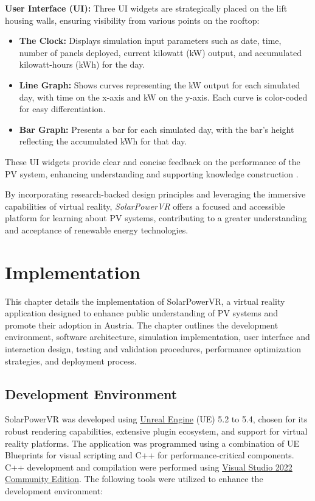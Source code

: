 \documentclass[draft, final]{vutinfth} %
\begin{document}
\textbf{User Interface (UI):} Three UI widgets are strategically placed on the lift housing walls, ensuring visibility from various points on the rooftop:
\begin{itemize}
    \item \textbf{The Clock:} Displays simulation input parameters such as date, time, number of panels deployed, current kilowatt (kW) output, and accumulated kilowatt-hours (kWh) for the day.
    \item \textbf{Line Graph:} Shows curves representing the kW output for each simulated day, with time on the x-axis and kW on the y-axis. Each curve is color-coded for easy differentiation.
    \item \textbf{Bar Graph:} Presents a bar for each simulated day, with the bar's height reflecting the accumulated kWh for that day.
\end{itemize}
These UI widgets provide clear and concise feedback on the performance of the PV system, enhancing understanding and supporting knowledge construction \cite{Merchant2014VrEffectiveness, Mikropoulos2011VrEducational, Sung2015Effects}.


By incorporating research-backed design principles and leveraging the immersive capabilities of virtual reality, \textit{SolarPowerVR} offers a focused and accessible platform for learning about PV systems, contributing to a greater understanding and acceptance of renewable energy technologies.

\chapter{Implementation}

This chapter details the implementation of SolarPowerVR, a virtual reality application designed to enhance public understanding of PV systems and promote their adoption in Austria.  The chapter outlines the development environment, software architecture, simulation implementation, user interface and interaction design, testing and validation procedures, performance optimization strategies, and deployment process.

\section{Development Environment}

SolarPowerVR was developed using \href{https://www.unrealengine.com/de}{Unreal Engine} (UE) 5.2 to 5.4, chosen for its robust rendering capabilities, extensive plugin ecosystem, and support for virtual reality platforms. The application was programmed using a combination of UE Blueprints for visual scripting and C++ for performance-critical components. C++ development and compilation were performed using \href{https://visualstudio.microsoft.com/de/vs/community/}{Visual Studio 2022 Community Edition}. The following tools were utilized to enhance the development environment:
\end{document}
